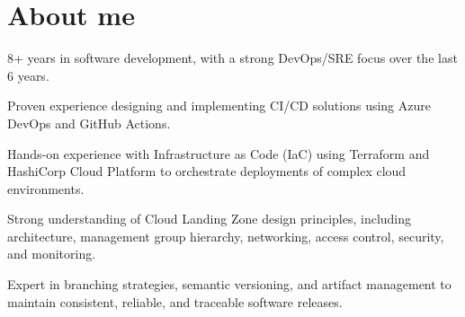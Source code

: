 \documentclass[11pt]{deedy-resume-openfont}
\begin{document}
    
%
%
{}
%
%
\vspace{0.5cm}
\section{About me}
\vspace{0.2cm}
\begin{tightemize}
	\item 8+ years in software development, with a strong DevOps/SRE focus over the last 6 years.
	\item Proven experience designing and implementing CI/CD solutions using Azure DevOps and GitHub Actions.
	\item Hands-on experience with Infrastructure as Code (IaC) using Terraform and HashiCorp Cloud Platform to orchestrate deployments of complex cloud environments.
	\item Strong understanding of Cloud Landing Zone design principles, including architecture, management group hierarchy, networking, access control, security, and monitoring.
	\item Expert in branching strategies, semantic versioning, and artifact management to maintain consistent, reliable, and traceable software releases.
\end{tightemize}
%
%
\vspace{0.5cm}
\end{document}
